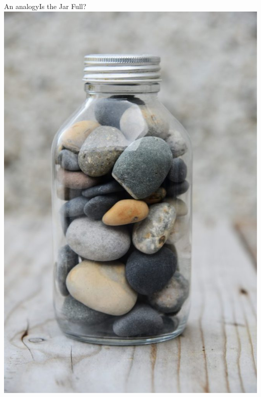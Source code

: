 \documentclass[10pt, compress, titleprogressbar, aspectratio=169]{beamer}
\begin{document}
        \begin{frame}{An analogy}{Is the Jar Full?}
            \vspace{1mm}
            \centering
            \includegraphics[width=\linewidth,height=\textheight,keepaspectratio]{./img/stones.jpg}
        \end{frame}
\end{document}
